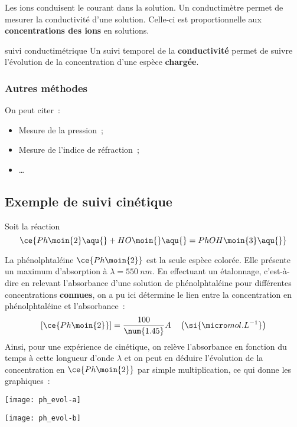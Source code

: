 \documentclass[../main/main.tex]{subfiles}
\begin{document}
Les ions conduisent le courant dans la solution. Un conductimètre permet de
mesurer la conductivité d'une solution. Celle-ci est proportionnelle aux
\textbf{concentrations des ions} en solutions.

\begin{prop}[label=prop:conducto, halign=center]{suivi conductimétrique}
    Un suivi temporel de la \textbf{conductivité} permet de suivre l'évolution
    de la concentration d'une espèce \textbf{chargée}.
\end{prop}

\subsubsection{Autres méthodes}
On peut citer~:

\begin{itemize}
    \item Mesure de la pression~;
    \item Mesure de l'indice de réfraction~;
    \item …
\end{itemize}

\subsection{Exemple de suivi cinétique}
Soit la réaction
\[\ce{Ph\moin{2}\aqu{} + HO\moin{}\aqu{} = PhOH\moin{3}\aqu{}}\]

La phénolphtaléine $\ce{Ph\moin{2}}$ est la seule espèce colorée. Elle présente
un maximum d'absorption à $\lambda = \SI{550}{nm}$. En effectuant un étalonnage,
c'est-à-dire en relevant l'absorbance d'une solution de phénolphtaléine pour
différentes concentrations \textbf{connues}, on a pu ici détermine le lien
entre la concentration en phénolphtaléine et l'absorbance~:
\[[\ce{Ph\moin{2}}] = \frac{100}{\num{1.45}}A
    \quad
    \left( \si{\micro mol.L^{-1}} \right)
\]
Ainsi, pour une expérience de cinétique, on relève l'absorbance en
fonction du temps à cette longueur d'onde $\lambda$ et on peut en déduire
l'évolution de la concentration en $\ce{Ph\moin{2}}$ par simple multiplication,
ce qui donne les graphiques~:

\begin{minipage}{0.49\linewidth}
    \begin{center}
        \texttt{[image: ph\_evol-a]}
    \end{center}
\end{minipage}
\begin{minipage}{0.49\linewidth}
    \begin{center}
        \texttt{[image: ph\_evol-b]}
    \end{center}
\end{minipage}
\end{document}
